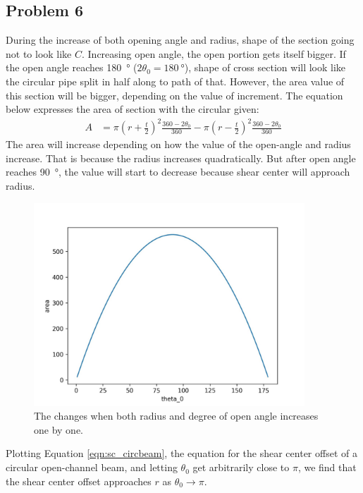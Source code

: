 \documentclass[12 pt]{report}
\begin{document}
\subsection{Problem 6}
During the increase of both opening angle and radius, shape of the section going not to look like $C$. Increasing open angle, the open portion gets itself bigger. If the open angle reaches \qty{180}{\degree} ($2\theta_0=\qty{180}{\degree}$), shape of cross section will look like the circular pipe split in half along to path of that. However, the area value of this section will be bigger, depending on the value of increment. The equation below expresses the area of section with the circular given:
\begin{align*}
	A&=\pi\left(r+\frac{t}{2}\right)^2\frac{360-2\theta_0}{360}-\pi\left(r-\frac{t}{2}\right)^2\frac{360-2\theta_0}{360}
\end{align*}
The area will increase depending on how the value of the open-angle and radius increase. That is because the radius increases quadratically. But after open angle reaches \qty{90}{\degree}, the value will start to decrease because shear center will approach radius.

\begin{figure}[htbp]
	\centering
	\includegraphics[width=4in]{images/Graphs/random_graph}
	\caption{The changes when both radius and degree of open angle increases one by one.}
	\label{fig:random_graph}
\end{figure}

Plotting Equation \ref{eqn:sc_circbeam}, the equation for the shear center offset of a circular open-channel beam, and letting $\theta_0$ get arbitrarily close to $\pi$, we find that the shear center offset approaches $r$ as $\theta_0\rightarrow\pi$.
\end{document}
